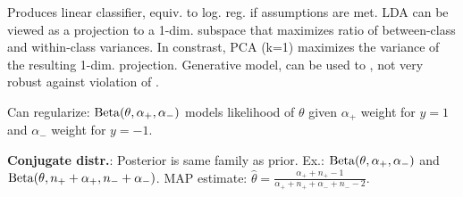 Produces linear classifier, equiv. to log. reg. if assumptions are met. LDA can be viewed as a projection to a 1-dim. subspace that maximizes ratio of between-class and within-class variances. In constrast, PCA (k=1) maximizes the variance of the resulting 1-dim. projection. Generative model, can be used to , not very robust against violation of .

Can regularize: $\operatorname*{Beta}(\theta,\alpha_+,\alpha_-)$ models likelihood of $\theta$
given $\alpha_+$ weight for $y=1$ and $\alpha_-$ weight for $y=-1$.

\textbf{Conjugate distr.}: Posterior is same family as prior. Ex.: $\operatorname*{Beta}(\theta,
\alpha_+, \alpha_-)$ and $\operatorname*{Beta}(\theta, n_+ + \alpha_+, n_- + \alpha_-)$. MAP
estimate: $\hat{\theta} = \frac{\alpha_+ + n_+ - 1}{\alpha_+ + n_+ + \alpha_- +
n_- - 2}$.
